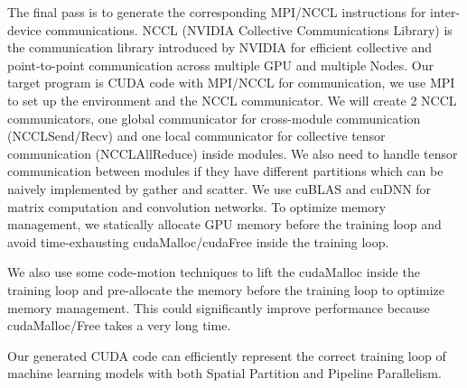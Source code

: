 \documentclass[sigplan]{acmart}\settopmatter{printfolios=true,printccs=false,printacmref=false}
\begin{document}
 The final pass is to generate the corresponding MPI/NCCL instructions for inter-device communications. NCCL (NVIDIA Collective Communications Library) is the communication library introduced by NVIDIA for efficient collective and point-to-point communication across multiple GPU and multiple Nodes. Our target program is CUDA code with MPI/NCCL for communication, we use MPI to set up the environment and the NCCL communicator. We will create 2 NCCL communicators, one global communicator for cross-module communication (NCCLSend/Recv) and one local communicator for collective tensor communication (NCCLAllReduce) inside modules. We also need to handle tensor communication between modules if they have different partitions which can be naively implemented by gather and scatter. We use cuBLAS and cuDNN for matrix computation and convolution networks. To optimize memory management, we statically allocate GPU memory before the training loop and avoid time-exhausting cudaMalloc/cudaFree inside the training loop. \par
 We also use some code-motion techniques to lift the cudaMalloc inside the training loop and pre-allocate the memory before the training loop to optimize memory management. This could significantly improve performance because cudaMalloc/Free takes a very long time.\par
 Our generated CUDA code can efficiently represent the correct training loop of machine learning models with both Spatial Partition and Pipeline Parallelism.
\end{document}
